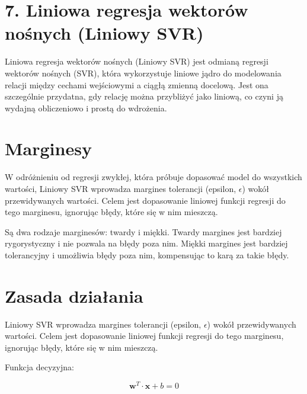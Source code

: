 {}
\justify
\fontsize{14}{16}\selectfont
\setlength{\parindent}{0pt}
\section*{7. Liniowa regresja wektorów nośnych (Liniowy SVR) \cite{alma991000280759708832}}
\label{sec:machine_learning_overview}
\fontsize{12}{14}\selectfont
\vspace{-1.0em}

Liniowa regresja wektorów nośnych (Liniowy SVR) jest odmianą regresji wektorów nośnych (SVR), która wykorzystuje liniowe jądro do modelowania relacji między cechami wejściowymi a ciągłą zmienną docelową. Jest ona szczególnie przydatna, gdy relację można przybliżyć jako liniową, co czyni ją wydajną obliczeniowo i prostą do wdrożenia.

{}
\section*{Marginesy}
\vspace{-1.0em}
\label{sec:what_is_ml}

W odróżnieniu od regresji zwykłej, która próbuje dopasować model do wszystkich wartości, Liniowy SVR wprowadza margines tolerancji (epsilon, $\epsilon$) wokół przewidywanych wartości. Celem jest dopasowanie liniowej funkcji regresji do tego marginesu, ignorując błędy, które się w nim mieszczą.

Są dwa rodzaje marginesów: twardy i miękki. 
Twardy margines jest bardziej rygorystyczny i nie pozwala na błędy poza nim. Miękki margines jest bardziej tolerancyjny i umożliwia błędy poza nim, kompensując to karą za takie błędy.

{}
\section*{Zasada działania}
\vspace{-1.0em}
\label{sec:what_is_ml}

Liniowy SVR wprowadza margines tolerancji (epsilon, $\epsilon$) wokół przewidywanych wartości. Celem jest dopasowanie liniowej funkcji regresji do tego marginesu, ignorując błędy, które się w nim mieszczą.

Funkcja decyzyjna:

$$
\boldsymbol{w}^T \cdot \boldsymbol{x} + b = 0
$$

